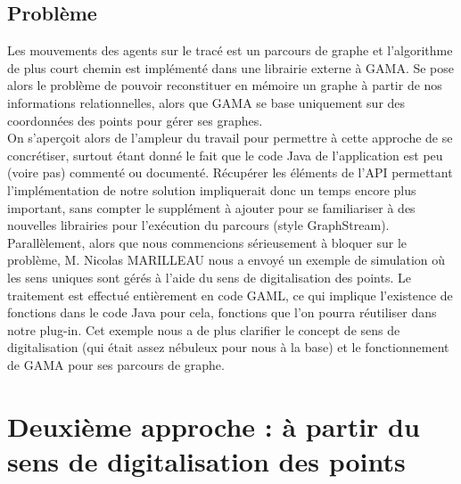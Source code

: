 \documentclass[11pt]{report} %
\begin{document}
\subsection{Probl\`eme}
Les mouvements des agents sur le trac\'e est un parcours de graphe et l'algorithme de plus court chemin est impl\'ement\'e dans une librairie externe \`a GAMA. Se pose alors le probl\`eme de pouvoir reconstituer en m\'emoire un graphe \`a partir de nos informations relationnelles, alors que GAMA se base uniquement sur des coordonn\'ees des points pour g\'erer ses graphes.\\
On s'aperçoit alors de l'ampleur du travail pour permettre \`a cette approche de se concr\'etiser, surtout \'etant donn\'e le fait que le code Java de l'application est peu (voire pas) comment\'e ou document\'e. R\'ecup\'erer les \'el\'ements de l'API permettant l'impl\'ementation de notre solution impliquerait donc un temps encore plus important, sans compter le suppl\'ement \`a ajouter pour se familiariser \`a des nouvelles librairies pour l'ex\'ecution du parcours (style GraphStream).\\
Parall\`element, alors que nous commencions s\'erieusement \`a bloquer sur le probl\`eme, M. Nicolas MARILLEAU nous a envoy\'e un exemple de simulation o\`u les sens uniques sont g\'er\'es \`a l'aide du sens de digitalisation des points. Le traitement est effectu\'e enti\`erement en code GAML, ce qui implique l'existence de fonctions dans le code Java pour cela, fonctions que l'on pourra r\'eutiliser dans notre plug-in. Cet exemple nous a de plus clarifier le concept de sens de digitalisation (qui \'etait assez n\'ebuleux pour nous \`a la base) et le fonctionnement de GAMA pour ses parcours de graphe.

\section{Deuxi\`eme approche : \`a partir du sens de digitalisation des points}
\end{document}
